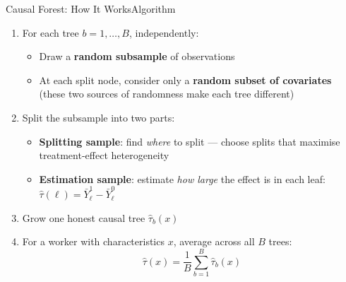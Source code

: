 \documentclass[hyperref={pdfpagelabels=false}]{beamer}
\begin{document}
\begin{frame}{Causal Forest: How It Works}{Algorithm}

\begin{enumerate}
  \item For each tree $b = 1, \ldots, B$, independently:
  \vspace{0.05cm}
  \begin{itemize}
    \item Draw a \textbf{random subsample} of observations
    \item At each split node, consider only a \textbf{random subset of covariates}\\
          {\scriptsize (these two sources of randomness make each tree different)}
  \end{itemize}
  \vspace{0.08cm}
  \item Split the subsample into two parts:
  \vspace{0.05cm}
  \begin{itemize}
    \item \textbf{Splitting sample}: find \emph{where} to split ---
          choose splits that maximise treatment-effect heterogeneity
    \item \textbf{Estimation sample}: estimate \emph{how large} the effect is
          in each leaf: $\hat{\tau}(\ell)=\bar{Y}^{1}_{\ell}-\bar{Y}^{0}_{\ell}$
  \end{itemize}
  \vspace{0.08cm}
  \item Grow one honest causal tree $\hat{\tau}_b(x)$
  \vspace{0.08cm}
  \item For a worker with characteristics $x$, average across all $B$ trees:
  \[
    \hat{\tau}(x)
    =
    \frac{1}{B}\sum_{b=1}^{B}\hat{\tau}_b(x)
  \]
\end{enumerate}

\end{frame}
\end{document}
